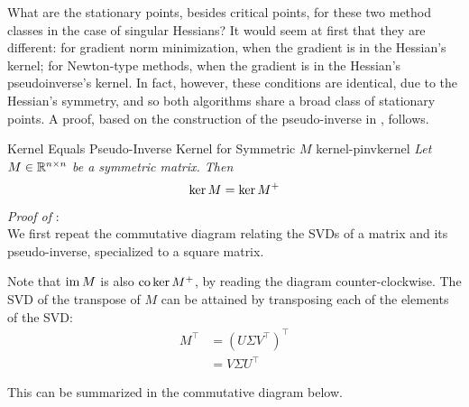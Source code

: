 \documentclass[../../thesis.tex]{subfiles}
\begin{document}
What are the stationary points, besides critical points,
for these two method classes in the case of singular Hessians?
It would seem at first that they are different:
for gradient norm minimization,
when the gradient is in the Hessian's kernel;
for Newton-type methods,
when the gradient is in the Hessian's pseudoinverse's kernel.
In fact, however,
these conditions are identical, due to the Hessian's symmetry,
and so both algorithms share a broad class of stationary points.
A proof, based on the construction of the pseudo-inverse in
, follows.

\begin{theorem}{Kernel Equals Pseudo-Inverse Kernel for Symmetric $M$}%
{kernel-pinvkernel}
	\emph{%
		Let $M\in\mathbb{R}^{n \times n}$ be a symmetric matrix.
		Then
		\begin{equation}
			\ker M  = \ker M^{+}
		\end{equation}
	}
\end{theorem}

\noindent \textit{Proof of }:\\
We first repeat the commutative diagram
relating the SVDs of a matrix and its pseudo-inverse,
specialized to a square matrix.

\begin{center}
\end{center}

Note that $\operatorname*{im} M$ is also $\operatorname*{co}\ker M^{+}$,
by reading the diagram counter-clockwise.
The SVD of the transpose of $M$
can be attained by transposing each of the elements of the SVD\@:
\begin{align}
	M^\top
	&= {\left(U \Sigma V^\top\right)}^\top\\
	&= V \Sigma U^\top
\end{align}

This can be summarized in the commutative diagram below.
\end{document}
